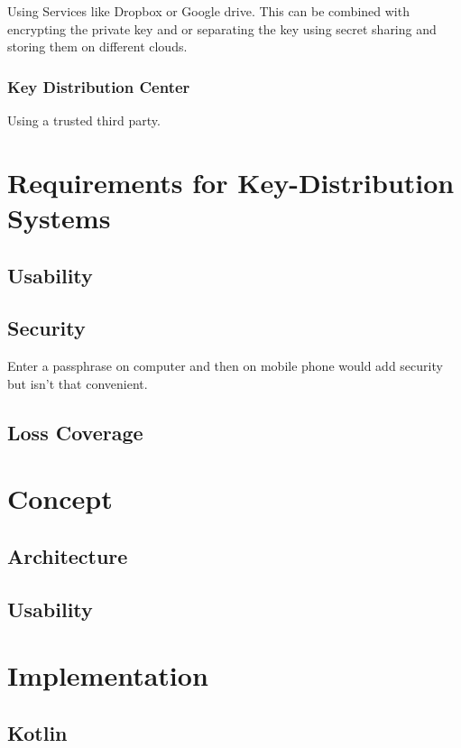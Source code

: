 \documentclass[12pt,twoside,a4paper,parskip]{scrbook}
\begin{document}
Using Services like Dropbox or Google drive. This can be combined with encrypting the private key and or separating the key using secret sharing and 
storing them on different clouds. 

\subsection{Key Distribution Center}

Using a trusted third party.

\chapter{Requirements for Key-Distribution Systems}

\section{Usability}

\section{Security}

Enter a passphrase on computer and then on mobile phone would add security but isn't that convenient.

\section{Loss Coverage}

\chapter{Concept}

\section{Architecture}

\section{Usability}

\chapter{Implementation}

\section{Kotlin}
\end{document}
